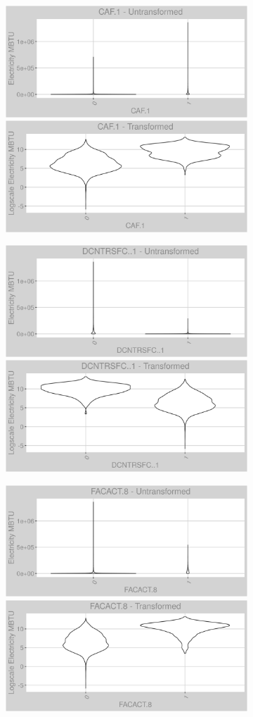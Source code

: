 \FloatBarrier
\newpage
\begin{figure}
\centering
\begin{subfigure}{1\textwidth}
\includegraphics[width=.49\textwidth, height=0.3\textheight]{Images/electricity_var_original_12.png}
\includegraphics[width=.49\textwidth, height=0.3\textheight]{Images/electricity_var_transformed_12.png}
\end{subfigure}
\begin{subfigure}{1\textwidth}
\centering
\includegraphics[width=.49\textwidth, height=0.3\textheight]{Images/electricity_var_original_13.png}
\includegraphics[width=.49\textwidth, height=0.3\textheight]{Images/electricity_var_transformed_13.png}
\end{subfigure}
\begin{subfigure}{1\textwidth}
\centering
\includegraphics[width=.49\textwidth, height=0.3\textheight]{Images/electricity_var_original_14.png}
\includegraphics[width=.49\textwidth, height=0.3\textheight]{Images/electricity_var_transformed_14.png}
\end{subfigure}
\end{figure}
